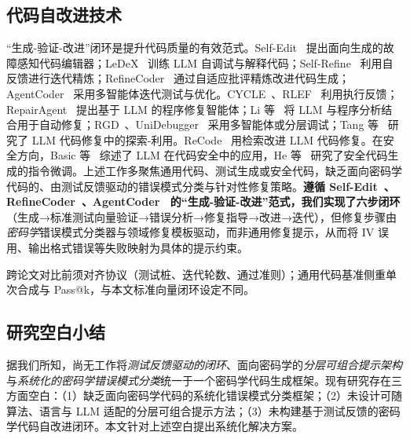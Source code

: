 \documentclass[12pt]{llncs}
\begin{document}
\subsection{代码自改进技术}
“生成-验证-改进”闭环是提升代码质量的有效范式。Self-Edit~\cite{selfedit} 提出面向生成的故障感知代码编辑器；LeDeX~\cite{ledex} 训练 LLM 自调试与解释代码；Self-Refine~\cite{selfrefine} 利用自反馈进行迭代精炼；RefineCoder~\cite{refinecoder} 通过自适应批评精炼改进代码生成；AgentCoder~\cite{agentcoder} 采用多智能体迭代测试与优化。CYCLE~\cite{cycle}、RLEF~\cite{rlef} 利用执行反馈；RepairAgent~\cite{repairagent} 提出基于 LLM 的程序修复智能体；Li 等~\cite{li2023} 将 LLM 与程序分析结合用于自动修复；RGD~\cite{rgd}、UniDebugger~\cite{unidebugger} 采用多智能体或分层调试；Tang 等~\cite{tang2024} 研究了 LLM 代码修复中的探索-利用。ReCode~\cite{recode} 用检索改进 LLM 代码修复。在安全方向，Basic 等~\cite{secsurvey} 综述了 LLM 在代码安全中的应用，He 等~\cite{securecodegen} 研究了安全代码生成的指令微调。上述工作多聚焦通用代码、测试生成或安全代码，缺乏面向密码学代码的、由测试反馈驱动的错误模式分类与针对性修复策略。\textbf{遵循 Self-Edit~\cite{selfedit}、RefineCoder~\cite{refinecoder}、AgentCoder~\cite{agentcoder} 的“生成-验证-改进”范式，我们实现了六步闭环}（生成→标准测试向量验证→错误分析→修复指导→改进→迭代），但修复步骤由\emph{密码学}错误模式分类器与领域修复模板驱动，而非通用修复提示，从而将 IV 误用、输出格式错误等失败映射为具体的提示约束。

跨论文对比前须对齐协议（测试桩、迭代轮数、通过准则）；通用代码基准侧重单次合成与 Pass@k，与本文标准向量闭环设定不同。

\subsection{研究空白小结}
\label{subsec:research_gaps}

据我们所知，尚无工作将\emph{测试反馈驱动的闭环}、面向密码学的\emph{分层可组合提示架构}与\emph{系统化的密码学错误模式分类}统一于一个密码学代码生成框架。现有研究存在三方面空白：（1）缺乏面向密码学代码的系统化错误模式分类框架；（2）未设计可随算法、语言与 LLM 适配的分层可组合提示方法；（3）未构建基于测试反馈的密码学代码自改进闭环。本文针对上述空白提出系统化解决方案。
\end{document}

